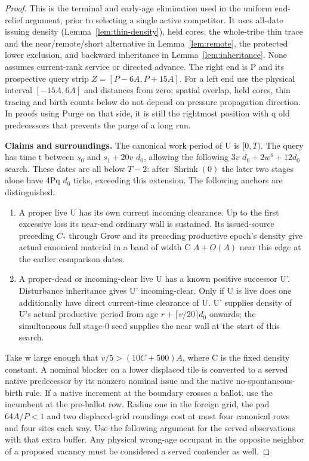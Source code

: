 \begin{proof}
This is the terminal and early-age elimination used in the uniform end-relief argument, prior to selecting a single active competitor. It uses all-date issuing density (Lemma~\ref{lem:thin-density}), held cores, the whole-tribe thin trace and the near/remote/short alternative in Lemma~\ref{lem:remote}, the protected lower exclusion, and backward inheritance in Lemma~\ref{lem:inheritance}. None assumes current-rank service or directed advance. The right end is P and its prospective query strip \(Z=[P- 6A,P+15A]\). For a left end use the physical interval \([- 15A,6A]\) and distances from zero; spatial overlap, held cores, thin tracing and birth counts below do not depend on pressure propagation direction. In proofs using Purge on that side, it is still the rightmost position with q old predecessors that prevents the purge of a long run.

\textbf{Claims and surroundings.} The canonical work period of U is \([0,T)\). The query has time t between \(s_0\) and \(s_1+20v\) \(d_0\), allowing the following \(3v\) \(d_0+2w^6+12d_0\) search. These dates are all below \(T- 2\): after \(\operatorname{Shrink}(0)\) the later two stages alone have 4Pq \(d_0\) ticks, exceeding this extension. The following anchors are distinguished.

\begin{enumerate}
\item A proper live U has its own current incoming clearance. Up to the first excessive loss its near-end ordinary wall is sustained. Its issued-source preceding \(C_*\) through Grow and its preceding productive epoch's density give actual canonical material in a band of width C \(A+O(A)\) near this edge at the earlier comparison dates.
\item A proper-dead or incoming-clear live U has a known positive successor U'. Disturbance inheritance gives U' incoming-clear. Only if U is live does one additionally have direct current-time clearance of U. U' supplies density of U's actual productive period from age \(r+\lceil v/20 \rceil d_0\) onwards; the simultaneous full stage-0 seed supplies the near wall at the start of this search.
\end{enumerate}

Take w large enough that \(v/5>(10C+500)A\), where C is the fixed density constant. A nominal blocker on a lower displaced tile is converted to a served native predecessor by its nonzero nominal issue and the native no-spontaneous-birth rule. If a native increment at the boundary crosses a ballot, use the incumbent at the pre-ballot row. Radius one in the foreign grid, the pad \(64A/P<1\) and two displaced-grid roundings cost at most four canonical rows and four sites each way. Use the following argument for the served observations with that extra buffer. Any physical wrong-age occupant in the opposite neighbor of a proposed vacancy must be considered a served contender as well.


\end{proof}
